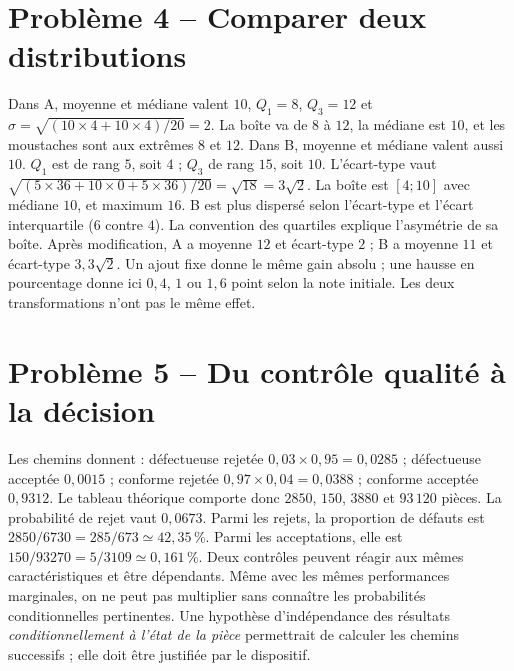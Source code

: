 \section*{Problème 4 -- Comparer deux distributions}
Dans A, moyenne et médiane valent $10$, $Q_1=8$, $Q_3=12$ et $\sigma=\sqrt{(10\times4+10\times4)/20}=2$. La boîte va de $8$ à $12$, la médiane est $10$, et les moustaches sont aux extrêmes $8$ et $12$.
Dans B, moyenne et médiane valent aussi $10$. $Q_1$ est de rang $5$, soit $4$ ; $Q_3$ de rang $15$, soit $10$. L'écart-type vaut $\sqrt{(5\times36+10\times0+5\times36)/20}=\sqrt{18}=3\sqrt2$. La boîte est $[4;10]$ avec médiane $10$, et maximum $16$. B est plus dispersé selon l'écart-type et l'écart interquartile ($6$ contre $4$). La convention des quartiles explique l'asymétrie de sa boîte.
Après modification, A a moyenne $12$ et écart-type $2$ ; B a moyenne $11$ et écart-type $3{,}3\sqrt2$. Un ajout fixe donne le même gain absolu ; une hausse en pourcentage donne ici $0{,}4$, $1$ ou $1{,}6$ point selon la note initiale. Les deux transformations n'ont pas le même effet.

\section*{Problème 5 -- Du contrôle qualité à la décision}
Les chemins donnent : défectueuse rejetée $0{,}03\times0{,}95=0{,}0285$ ; défectueuse acceptée $0{,}0015$ ; conforme rejetée $0{,}97\times0{,}04=0{,}0388$ ; conforme acceptée $0{,}9312$. Le tableau théorique comporte donc $2850$, $150$, $3880$ et $93\,120$ pièces.
La probabilité de rejet vaut $0{,}0673$. Parmi les rejets, la proportion de défauts est $2850/6730=285/673\simeq42{,}35\,\%$. Parmi les acceptations, elle est $150/93270=5/3109\simeq0{,}161\,\%$.
Deux contrôles peuvent réagir aux mêmes caractéristiques et être dépendants. Même avec les mêmes performances marginales, on ne peut pas multiplier sans connaître les probabilités conditionnelles pertinentes. Une hypothèse d'indépendance des résultats \emph{conditionnellement à l'état de la pièce} permettrait de calculer les chemins successifs ; elle doit être justifiée par le dispositif.

